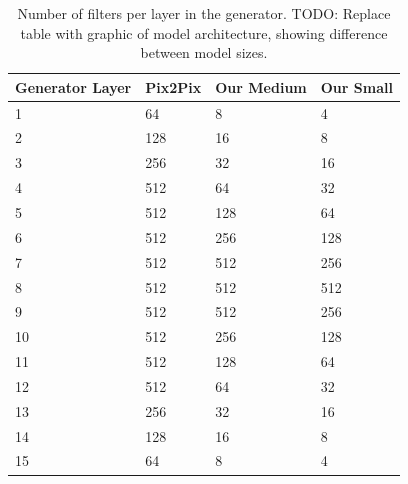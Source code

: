 \documentclass{article}
\begin{document}
\begin{small}
	\begin{table}
		\begin{center}
			\begin{tabular}{p{2cm}p{2cm}p{2cm}p{2cm}}
				\toprule
				Generator Layer & Pix2Pix & Our Medium & Our Small \\
				\midrule
				1               & 64      & 8          & 4         \\
				2               & 128     & 16         & 8         \\
				3               & 256     & 32         & 16        \\
				4               & 512     & 64         & 32        \\
				5               & 512     & 128        & 64        \\
				6               & 512     & 256        & 128       \\
				7               & 512     & 512        & 256       \\
				8               & 512     & 512        & 512       \\
				9               & 512     & 512        & 256       \\
				10              & 512     & 256        & 128       \\
				11              & 512     & 128        & 64        \\
				12              & 512     & 64         & 32        \\
				13              & 256     & 32         & 16        \\
				14              & 128     & 16         & 8         \\
				15              & 64      & 8          & 4         \\
				\bottomrule
			\end{tabular}
			\caption{Number of filters per layer in the generator. TODO: Replace table with graphic of model architecture, showing difference between model sizes.}
		\end{center}
	\end{table}
\end{small}
\end{document}
